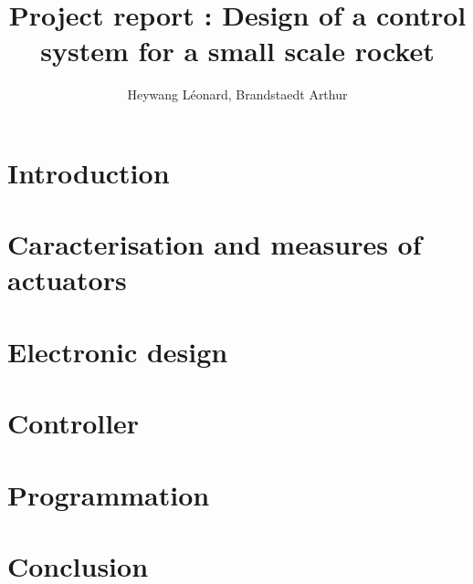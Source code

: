 \documentclass[twoside]{report}
\author{Heywang Léonard, Brandstaedt Arthur}
\title{Project report : Design of a control system for a small scale rocket}
\date{\DTMtoday}
\begin{document}



\tableofcontents
\listoffigures

\newpage
\chapter{Introduction}


\chapter{Caracterisation and measures of actuators}


\chapter{Electronic design}


\chapter{Controller}


\chapter{Programmation}


\chapter{Conclusion}


\printbibliography

\newpage
\appendix
\end{document}
